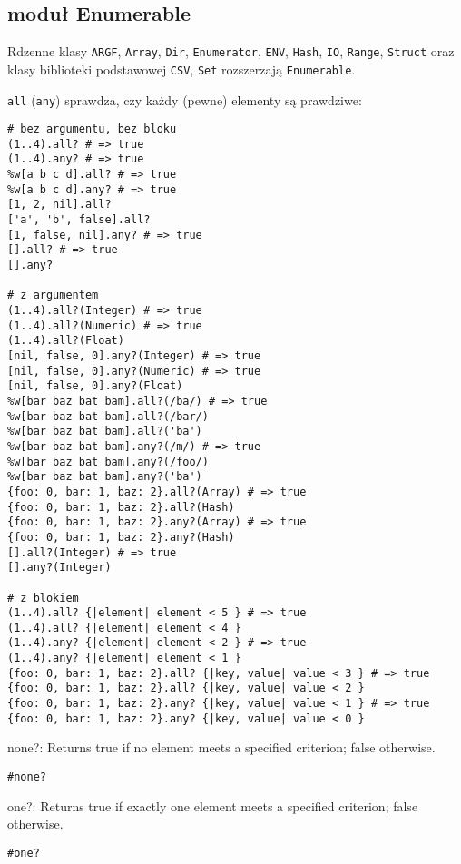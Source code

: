 \subsection{moduł Enumerable}
Rdzenne klasy \texttt{ARGF}, \texttt{Array}, \texttt{Dir}, \texttt{Enumerator}, \texttt{ENV}, \texttt{Hash}, \texttt{IO}, \texttt{Range}, \texttt{Struct} oraz klasy biblioteki podstawowej \texttt{CSV}, \texttt{Set} rozszerzają \texttt{Enumerable}.

\texttt{all} (\texttt{any}) sprawdza, czy każdy (pewne) elementy są prawdziwe:
\begin{verbatim}
# bez argumentu, bez bloku
(1..4).all? # => true
(1..4).any? # => true
%w[a b c d].all? # => true
%w[a b c d].any? # => true
[1, 2, nil].all?
['a', 'b', false].all?
[1, false, nil].any? # => true
[].all? # => true
[].any?

# z argumentem
(1..4).all?(Integer) # => true
(1..4).all?(Numeric) # => true
(1..4).all?(Float)
[nil, false, 0].any?(Integer) # => true
[nil, false, 0].any?(Numeric) # => true
[nil, false, 0].any?(Float)
%w[bar baz bat bam].all?(/ba/) # => true
%w[bar baz bat bam].all?(/bar/)
%w[bar baz bat bam].all?('ba')
%w[bar baz bat bam].any?(/m/) # => true
%w[bar baz bat bam].any?(/foo/)
%w[bar baz bat bam].any?('ba')
{foo: 0, bar: 1, baz: 2}.all?(Array) # => true
{foo: 0, bar: 1, baz: 2}.all?(Hash)
{foo: 0, bar: 1, baz: 2}.any?(Array) # => true
{foo: 0, bar: 1, baz: 2}.any?(Hash)
[].all?(Integer) # => true
[].any?(Integer)

# z blokiem
(1..4).all? {|element| element < 5 } # => true
(1..4).all? {|element| element < 4 }
(1..4).any? {|element| element < 2 } # => true
(1..4).any? {|element| element < 1 }
{foo: 0, bar: 1, baz: 2}.all? {|key, value| value < 3 } # => true
{foo: 0, bar: 1, baz: 2}.all? {|key, value| value < 2 }
{foo: 0, bar: 1, baz: 2}.any? {|key, value| value < 1 } # => true
{foo: 0, bar: 1, baz: 2}.any? {|key, value| value < 0 }
\end{verbatim}

none?: Returns true if no element meets a specified criterion; false otherwise.
\begin{verbatim}
#none?
\end{verbatim}

one?: Returns true if exactly one element meets a specified criterion; false otherwise.
\begin{verbatim}
#one?
\end{verbatim}

